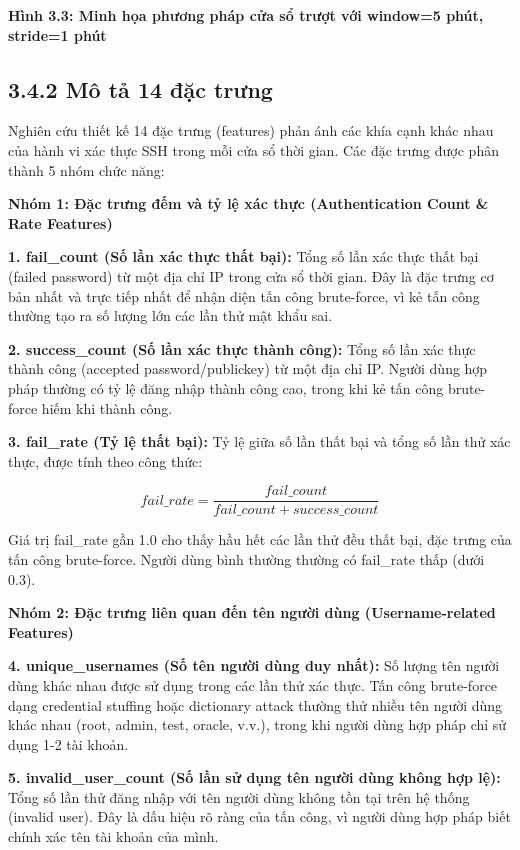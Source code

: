 \documentclass[
  a4paper]{report}
\begin{document}
\textbf{Hình 3.3: Minh họa phương pháp cửa sổ trượt với window=5 phút,
stride=1 phút}

\subsection{3.4.2 Mô tả 14 đặc
trưng}\label{muxf4-tux1ea3-14-ux111ux1eb7c-trux1b0ng}

Nghiên cứu thiết kế 14 đặc trưng (features) phản ánh các khía cạnh khác
nhau của hành vi xác thực SSH trong mỗi cửa sổ thời gian. Các đặc trưng
được phân thành 5 nhóm chức năng:

\textbf{Nhóm 1: Đặc trưng đếm và tỷ lệ xác thực (Authentication Count \&
Rate Features)}

\textbf{1. fail\_count (Số lần xác thực thất bại):} Tổng số lần xác thực
thất bại (failed password) từ một địa chỉ IP trong cửa sổ thời gian. Đây
là đặc trưng cơ bản nhất và trực tiếp nhất để nhận diện tấn công
brute-force, vì kẻ tấn công thường tạo ra số lượng lớn các lần thử mật
khẩu sai.

\textbf{2. success\_count (Số lần xác thực thành công):} Tổng số lần xác
thực thành công (accepted password/publickey) từ một địa chỉ IP. Người
dùng hợp pháp thường có tỷ lệ đăng nhập thành công cao, trong khi kẻ tấn
công brute-force hiếm khi thành công.

\textbf{3. fail\_rate (Tỷ lệ thất bại):} Tỷ lệ giữa số lần thất bại và
tổng số lần thử xác thực, được tính theo công thức:

\[fail\_rate = \frac{fail\_count}{fail\_count + success\_count}\]

Giá trị fail\_rate gần 1.0 cho thấy hầu hết các lần thử đều thất bại,
đặc trưng của tấn công brute-force. Người dùng bình thường thường có
fail\_rate thấp (dưới 0.3).

\textbf{Nhóm 2: Đặc trưng liên quan đến tên người dùng (Username-related
Features)}

\textbf{4. unique\_usernames (Số tên người dùng duy nhất):} Số lượng tên
người dùng khác nhau được sử dụng trong các lần thử xác thực. Tấn công
brute-force dạng credential stuffing hoặc dictionary attack thường thử
nhiều tên người dùng khác nhau (root, admin, test, oracle, v.v.), trong
khi người dùng hợp pháp chỉ sử dụng 1-2 tài khoản.

\textbf{5. invalid\_user\_count (Số lần sử dụng tên người dùng không hợp
lệ):} Tổng số lần thử đăng nhập với tên người dùng không tồn tại trên hệ
thống (invalid user). Đây là dấu hiệu rõ ràng của tấn công, vì người
dùng hợp pháp biết chính xác tên tài khoản của mình.
\end{document}
